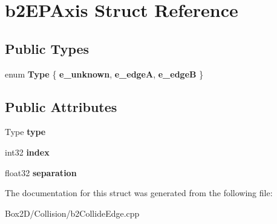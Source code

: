 \hypertarget{structb2_e_p_axis}{}\section{b2\+E\+P\+Axis Struct Reference}
\label{structb2_e_p_axis}
\subsection*{Public Types}
\begin{DoxyCompactItemize}
\item 
\mbox{\label{structb2_e_p_axis_a1a2feab0d321a5cd20677c92cbfd6f3c}} 
enum {\bfseries Type} \{ {\bfseries e\+\_\+unknown}, 
{\bfseries e\+\_\+edgeA}, 
{\bfseries e\+\_\+edgeB}
 \}
\end{DoxyCompactItemize}
\subsection*{Public Attributes}
\begin{DoxyCompactItemize}
\item 
\mbox{\label{structb2_e_p_axis_a336d3ba4b4ed020a1f6c4c0f70098e39}} 
Type {\bfseries type}
\item 
\mbox{\label{structb2_e_p_axis_a8e530d411d98e7ab8112c4022f5f65e4}} 
int32 {\bfseries index}
\item 
\mbox{\label{structb2_e_p_axis_acfd60cfd1f1ad4c448bd0260117ef6fc}} 
float32 {\bfseries separation}
\end{DoxyCompactItemize}


The documentation for this struct was generated from the following file\+:\begin{DoxyCompactItemize}
\item 
Box2\+D/\+Collision/b2\+Collide\+Edge.\+cpp\end{DoxyCompactItemize}
